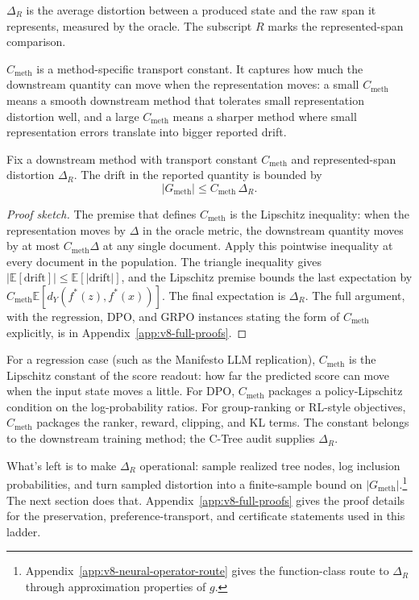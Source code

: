 \(\Delta_R\) is the average distortion between a produced state and
the raw span it represents, measured by the oracle. The subscript
\(R\) marks the represented-span comparison.

\(C_{\mathrm{meth}}\) is a method-specific transport constant. It
captures how much the downstream quantity can move when the
representation moves: a small \(C_{\mathrm{meth}}\) means a smooth
downstream method that tolerates small representation distortion well,
and a large \(C_{\mathrm{meth}}\) means a sharper method where small
representation errors translate into bigger reported drift.

\begin{proposition}\label{prop:v10-population-gap}
Fix a downstream method with transport constant \(C_{\mathrm{meth}}\)
and represented-span distortion \(\Delta_R\). The drift in the
reported quantity is bounded by
\begin{equation}
\label{eq:v8-population-gap}
  |G_{\mathrm{meth}}|
  \le
  C_{\mathrm{meth}}\,\Delta_R .
\end{equation}
\end{proposition}

\begin{proof}[Proof sketch]
The premise that defines \(C_{\mathrm{meth}}\) is the Lipschitz
inequality: when the representation moves by \(\Delta\) in the oracle
metric, the downstream quantity moves by at most
\(C_{\mathrm{meth}}\Delta\) at any single document. Apply this
pointwise inequality at every document in the population. The
triangle inequality gives
\(|\mathbb E[\mathrm{drift}]|\le\mathbb E[|\mathrm{drift}|]\), and
the Lipschitz premise bounds the last expectation by
\(C_{\mathrm{meth}}\mathbb E[d_Y(f^\ast(z),f^\ast(x))]\). The final
expectation is \(\Delta_R\).
The full argument, with the regression, DPO, and GRPO instances
stating the form of \(C_{\mathrm{meth}}\) explicitly, is in
Appendix~\ref{app:v8-full-proofs}.
\end{proof}

For a regression case (such as the Manifesto LLM replication),
\(C_{\mathrm{meth}}\) is the Lipschitz constant of the score
readout: how far the predicted score can move when the input state
moves a little. For DPO, \(C_{\mathrm{meth}}\) packages a
policy-Lipschitz condition on the log-probability ratios. For
group-ranking or RL-style objectives, \(C_{\mathrm{meth}}\) packages
the ranker, reward, clipping, and KL terms. The constant belongs to
the downstream training method; the C-Tree audit supplies
\(\Delta_R\).

What's left is to make \(\Delta_R\) operational: sample realized
tree nodes, log inclusion probabilities, and turn sampled distortion
into a finite-sample bound on
\(|G_{\mathrm{meth}}|\).\footnote{Appendix~\ref{app:v8-neural-operator-route}
gives the function-class route to \(\Delta_R\) through approximation
properties of \(g\).} The next section does that.
Appendix~\ref{app:v8-full-proofs} gives the proof details for the
preservation, preference-transport, and certificate statements used
in this ladder.
